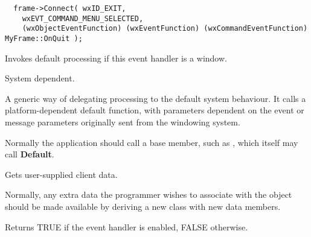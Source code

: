 



\begin{verbatim}
  frame->Connect( wxID_EXIT,
    wxEVT_COMMAND_MENU_SELECTED,
    (wxObjectEventFunction) (wxEventFunction) (wxCommandEventFunction) MyFrame::OnQuit );
\end{verbatim}

\label{wxevthandlerdefault}


Invokes default processing if this event handler is a window.


System dependent.


A generic way of delegating processing to the default system behaviour. It calls a platform-dependent
default function, with parameters dependent on the event or message parameters
originally sent from the windowing system.

Normally the application should call a base member, such as , which itself
may call {\bf Default}.

\label{wxevthandlergetclientdata}


Gets user-supplied client data.


Normally, any extra data the programmer wishes to associate with the object
should be made available by deriving a new class
with new data members.



\label{wxevthandlergetevthandlerenabled}


Returns TRUE if the event handler is enabled, FALSE otherwise.

